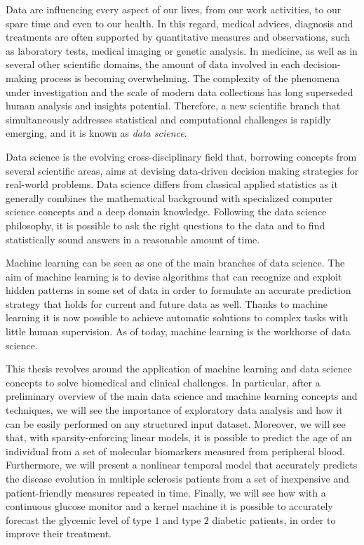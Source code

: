 

Data are influencing every aspect of our lives, from our work activities, to our spare time and even to our health.
In this regard, medical advices, diagnosis and treatments are often supported by quantitative measures and observations, such as laboratory tests, medical imaging or genetic analysis.
In medicine, as well as in several other scientific domains, the amount of data involved in each decision-making process is becoming overwhelming.
The complexity of the phenomena under investigation and the scale of modern data collections has long superseded human analysis and insights potential.
Therefore, a new scientific branch that simultaneously addresses statistical and computational challenges is rapidly emerging, and it is known as \textit{data science}.

Data science is the evolving cross-disciplinary field that, borrowing concepts from several scientific areas, aims at devising data-driven decision making strategies for real-world problems.
Data science differs from classical applied statistics as it generally combines the mathematical background with specialized computer science concepts and a deep domain knowledge.
Following the data science philosophy, it is possible to ask the right questions to the data and to find statistically sound answers in a reasonable amount of time.

Machine learning can be seen as one of the main branches of data science. The aim of machine learning is to devise algorithms that can recognize and exploit hidden patterns in some set of data in order to formulate an accurate prediction strategy that holds for current and future data as well. Thanks to machine learning it is now possible to achieve automatic solutions to complex tasks with little human supervision.
As of today, machine learning is the workhorse of data science.

This thesis revolves around the application of machine learning and data science concepts to solve biomedical and clinical challenges. In particular, after a preliminary overview of the main data science and machine learning concepts and techniques, we will see the importance of exploratory data analysis and how it can be easily performed on any structured input dataset. Moreover, we will see that, with sparsity-enforcing linear models, it is possible to predict the age of an individual from a set of molecular biomarkers measured from peripheral blood. Furthermore, we will present a nonlinear temporal model that accurately predicts the disease evolution in multiple sclerosis patients from a set of inexpensive and patient-friendly measures repeated in time. Finally, we will see how with a continuous glucose monitor and a kernel machine it is possible to accurately forecast the glycemic level of type $1$ and type $2$ diabetic patients, in order to improve their treatment.





